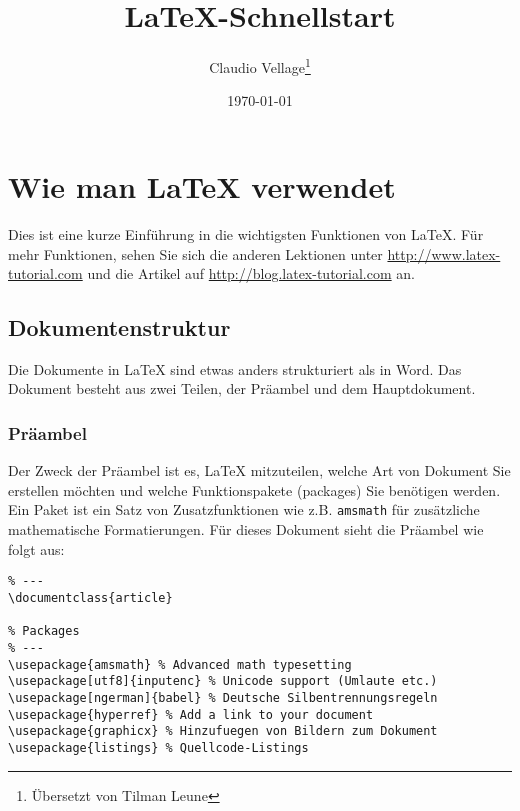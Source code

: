 \documentclass[10pt]{article}
\begin{document}
\author{Claudio Vellage\thanks{Übersetzt von Tilman Leune}} 
\title{\LaTeX{}-Schnellstart}
\date{\today{}} %

\maketitle{} %

\tableofcontents{} %

\section{Wie man \LaTeX{} verwendet}
Dies ist eine kurze Einführung in die wichtigsten Funktionen von \LaTeX{}. Für mehr
Funktionen, sehen Sie sich die anderen Lektionen unter \url{http://www.latex-tutorial.com} und die
Artikel auf \url{http://blog.latex-tutorial.com} an. 

\subsection{Dokumentenstruktur}
Die Dokumente in \LaTeX{} sind etwas anders strukturiert als in Word. Das Dokument besteht aus zwei Teilen, der Präambel und dem Hauptdokument. 

\subsubsection{Präambel}
Der Zweck der Präambel ist es, \LaTeX{} mitzuteilen, welche Art von Dokument Sie erstellen möchten
und welche Funktionspakete (packages) Sie benötigen werden. Ein Paket ist ein Satz von Zusatzfunktionen wie z.B. \texttt{amsmath} für zusätzliche mathematische Formatierungen. Für dieses Dokument sieht die Präambel wie folgt aus:

\begin{lstlisting}[language={[LaTeX]TeX},caption=Präambel dieses Dokumentes, breaklines=true,frame=single]
% Preamble
% ---
\documentclass{article}

% Packages
% ---
\usepackage{amsmath} % Advanced math typesetting
\usepackage[utf8]{inputenc} % Unicode support (Umlaute etc.)
\usepackage[ngerman]{babel} % Deutsche Silbentrennungsregeln
\usepackage{hyperref} % Add a link to your document
\usepackage{graphicx} % Hinzufuegen von Bildern zum Dokument
\usepackage{listings} % Quellcode-Listings 
\end{lstlisting}
\end{document}
